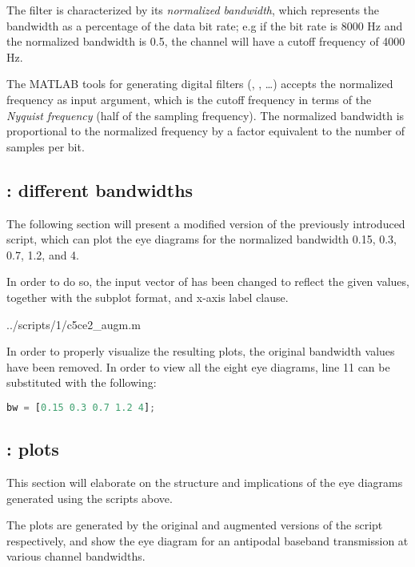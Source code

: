 The filter is characterized by its \emph{normalized bandwidth}, which represents the bandwidth as a percentage of the data bit rate; e.g if the bit rate is 8000 Hz and the normalized bandwidth is 0.5, the channel will have a cutoff frequency of 4000 Hz.

The MATLAB tools for generating digital filters (, , \dots) accepts the normalized frequency as input argument, which is the cutoff frequency in terms of the \emph{Nyquist frequency} (half of the sampling frequency).
The normalized bandwidth is proportional to the normalized frequency by a factor equivalent to the number of samples per bit.


\subsection{: different bandwidths}
The following section will present a modified version of the previously introduced script, which can plot the eye diagrams for the normalized bandwidth 0.15, 0.3, 0.7, 1.2, and 4.

In order to do so, the input vector of  has been changed to reflect the given values, together with the subplot format, and x-axis label clause.

\begin{lstinputlisting}[language=Octave]{../scripts/1/c5ce2_augm.m}
\end{lstinputlisting}

In order to properly visualize the resulting plots, the original bandwidth values have been removed.
In order to view all the eight eye diagrams, line 11 can be substituted with the following:

\begin{lstlisting}[language=Octave]
    bw = [0.15 0.3 0.7 1.2 4];
\end{lstlisting}


\subsection{: plots}
This section will elaborate on the structure and implications of the eye diagrams generated using the scripts above.

The plots are generated by the original and augmented versions of the script respectively, and show the eye diagram for an antipodal baseband transmission at various channel bandwidths.


